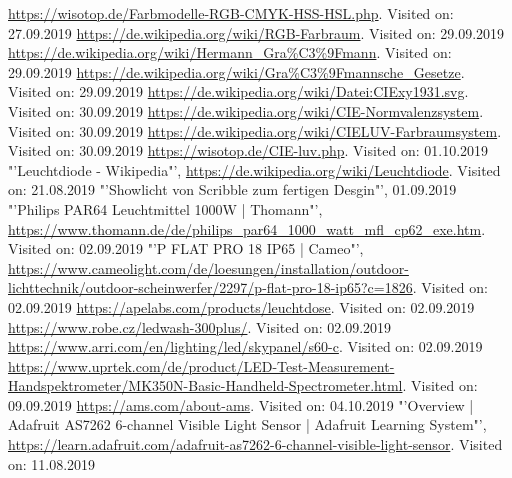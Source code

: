 \documentclass[11pt]{scrartcl}
\begin{document}
\begin{thebibliography}{xxxxxxxxxxxxxxxxxxx}
     \url{https://wisotop.de/Farbmodelle-RGB-CMYK-HSS-HSL.php}. Visited on: 27.09.2019
     \url{https://de.wikipedia.org/wiki/RGB-Farbraum}. Visited on: 29.09.2019
     \url{https://de.wikipedia.org/wiki/Hermann\_Gra%C3%9Fmann}. Visited on: 29.09.2019
     \url{https://de.wikipedia.org/wiki/Gra%C3%9Fmannsche_Gesetze}. Visited on: 29.09.2019
     \url{https://de.wikipedia.org/wiki/Datei:CIExy1931.svg}. Visited on: 30.09.2019
     \url{https://de.wikipedia.org/wiki/CIE-Normvalenzsystem}. Visited on: 30.09.2019
     \url{https://de.wikipedia.org/wiki/CIELUV-Farbraumsystem}. Visited on: 30.09.2019
     \url{https://wisotop.de/CIE-luv.php}. Visited on: 01.10.2019
    "'Leuchtdiode - Wikipedia"', \url{https://de.wikipedia.org/wiki/Leuchtdiode}. Visited on: 21.08.2019
    "'Showlicht von Scribble zum fertigen Desgin"', 01.09.2019
    "'Philips PAR64 Leuchtmittel 1000W | Thomann"', \url{https://www.thomann.de/de/philips_par64_1000_watt_mfl_cp62_exe.htm}. Visited on: 02.09.2019
    "'P FLAT PRO 18 IP65 | Cameo"', \url{https://www.cameolight.com/de/loesungen/installation/outdoor-lichttechnik/outdoor-scheinwerfer/2297/p-flat-pro-18-ip65?c=1826}. Visited on: 02.09.2019
     \url{https://apelabs.com/products/leuchtdose}. Visited on: 02.09.2019
     \url{https://www.robe.cz/ledwash-300plus/}. Visited on: 02.09.2019
     \url{https://www.arri.com/en/lighting/led/skypanel/s60-c}. Visited on: 02.09.2019
     \url{https://www.uprtek.com/de/product/LED-Test-Measurement-Handspektrometer/MK350N-Basic-Handheld-Spectrometer.html}. Visited on: 09.09.2019
     \url{https://ams.com/about-ams}. Visited on: 04.10.2019
    "'Overview | Adafruit AS7262 6-channel Visible Light Sensor | Adafruit Learning System"', \url{https://learn.adafruit.com/adafruit-as7262-6-channel-visible-light-sensor}. Visited on: 11.08.2019

\end{thebibliography}
\end{document}
